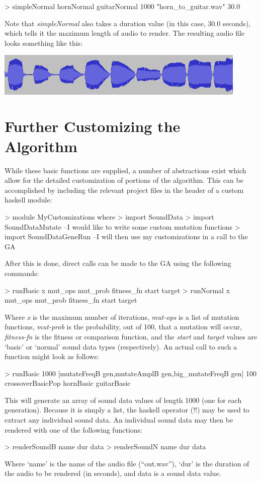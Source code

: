 \documentclass[11pt]{article}
\begin{document}
\begin{code}
> simpleNormal hornNormal guitarNormal 1000 "horn_to_guitar.wav" 30.0 
\end{code}
Note that \emph{simpleNormal} also takes a duration value (in this case, 30.0 seconds), which tells it the maximum length of audio to render.
The resulting audio file looks something like this:

\includegraphics[width=120mm]{normal_wav.png}

\section{Further Customizing the Algorithm}
While these basic functions are supplied, a number of abstractions exist which allow for the detailed customization of portions of the algorithm. This can be accomplished by including the relevant project files in the header of a custom haskell module:
\begin{code}
> module MyCustomizations where
> import SoundData
> import SoundDataMutate --I would like to write some custom mutation functions
> import SoundDataGeneRun --I will then use my customizations in a call to the GA
\end{code}
After this is done, direct calls can be made to the GA using the following commands:
\begin{code}
> runBasic  x mut_ops mut_prob fitness_fn start target
> runNormal x mut_ops mut_prob fitness_fn start target
\end{code}
Where \emph{x} is the maximum number of iterations, \emph{mut-ops} is a list of mutation functions, \emph{mut-prob} is the probability, out of 100, that a mutation will occur, \emph{fitness-fn} is the fitness or comparison function, and the \emph{start} and \emph{target} values are `basic' or `normal' sound data types (respectively). An actual call to such a function might look as follows:
\begin{code}
> runBasic 1000 [mutateFreqB gen,mutateAmplB gen,big_mutateFreqB gen] 100 crossoverBasicPop hornBasic guitarBasic
\end{code}
This will generate an array of sound data values of length 1000 (one for each generation). Because it is simply a list, the haskell operator (!!) may be used to extract any individual sound data. An individual sound data may then be rendered with one of the following functions:
\begin{code}
> renderSoundB name dur data
> renderSoundN name dur data
\end{code}
Where `name' is the name of the audio file (``out.wav''), `dur' is the duration of the audio to be rendered (in seconds), and data is a sound data value.
\end{document}
